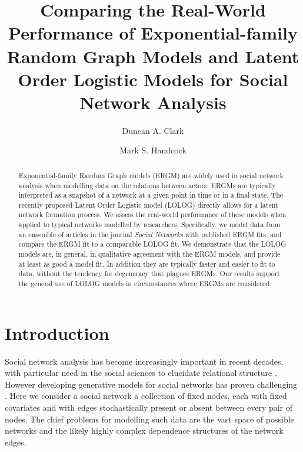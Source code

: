 \documentclass[
]{statsoc}
\title[ERGM and LOLOG Real-World Performance]{Comparing the Real-World Performance of Exponential-family Random Graph Models and Latent Order Logistic Models for Social Network Analysis}
\author[Duncan A. Clark]{Duncan A. Clark}
\author[Mark S. Handcock]{Mark S. Handcock}
\author{}
\date{\vspace{-2.5em}}
\begin{document}
\newcommand{\R}{\mathbb{R}}
\newcommand{\N}{\mathbb{N}}
\newcommand{\E}{\mathbb{E}}
\newcommand{\V}{\mathbb{V}}
\newcommand{\bfR}{\mathbf{R}}
\newcommand{\bfX}{\mathbf{X}}
\newcommand{\bfW}{\mathbf{W}}
\newcommand{\bfD}{\mathbf{D}}
\newcommand{\INT}{\int_{-\infty}^{+\infty}}
\newcommand{\p}{\partial}
\newcommand{\ra}{\Rightarrow}
\newcommand{\dH}{d\mathscr{H}}
\newcommand{\ch}{\text{cosh}}
\newcommand{\sh}{\text{sinh}}
\newcommand{\ex}{\mathbb{E}\left[X\right]}
\newcommand{\ey}{\mathbb{E}\left[Y\right]}
\newcommand{\logit}{{\rm logit}}
\newcommand{\MOM}{{\rm MOM}}

\setcounter{secnumdepth}{4}

\begin{abstract}
Exponential-family Random Graph models (ERGM) are widely used in social network analysis when modelling data on the relations between actors. ERGMs are typically interpreted as a snapshot of a network at a given point in time or in a final state. The recently proposed Latent Order Logistic model (LOLOG) directly allows for a latent network formation process. We assess the real-world performance of these models when applied to typical networks modelled by researchers. Specifically, 
we model data from an ensemble of articles in the journal \textit{Social Networks} with published ERGM fits, and compare the ERGM fit to a comparable LOLOG fit. We demonstrate that the LOLOG models are, in general, in qualitative agreement with the ERGM models, and provide at least as good a model fit. In addition they are typically faster and easier to fit to data, without the tendency for degeneracy that plagues ERGMs.
Our results support the general use of LOLOG models in circumstances where ERGMs are considered.
\end{abstract}

\section{Introduction}

Social network analysis has become increasingly important in recent
decades, with particular need in the social sciences to elucidate
relational structure \citep{Goldenberg2010}. However developing
generative models for social networks has proven challenging
\citep{chatterjee2013}. Here we consider a social network a collection
of fixed nodes, each with fixed covariates and with edges stochastically
present or absent between every pair of nodes. The chief problems for
modelling such data are the vast space of possible networks and the
likely highly complex dependence structures of the network edges.
\end{document}
